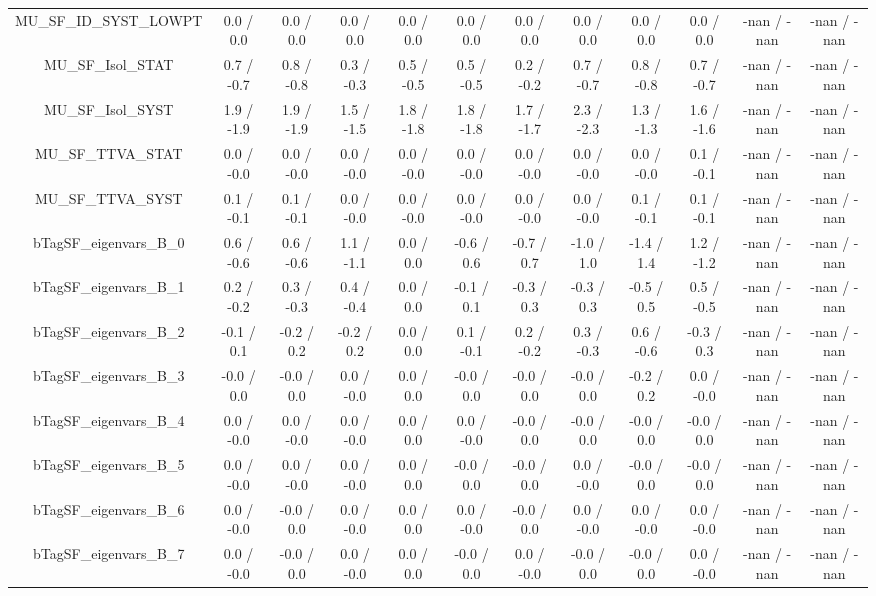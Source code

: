\begin{table}[htbp]
\begin{center}
\begin{tabular}{|c|c|c|c|c|c|c|c|c|c|c|c|}
  MU_SF_ID_SYST_LOWPT & 0.0 / 0.0 & 0.0 / 0.0 & 0.0 / 0.0 & 0.0 / 0.0 & 0.0 / 0.0 & 0.0 / 0.0 & 0.0 / 0.0 & 0.0 / 0.0 & 0.0 / 0.0 & -nan / -nan & -nan / -nan \\ 
  MU_SF_Isol_STAT & 0.7 / -0.7 & 0.8 / -0.8 & 0.3 / -0.3 & 0.5 / -0.5 & 0.5 / -0.5 & 0.2 / -0.2 & 0.7 / -0.7 & 0.8 / -0.8 & 0.7 / -0.7 & -nan / -nan & -nan / -nan \\ 
  MU_SF_Isol_SYST & 1.9 / -1.9 & 1.9 / -1.9 & 1.5 / -1.5 & 1.8 / -1.8 & 1.8 / -1.8 & 1.7 / -1.7 & 2.3 / -2.3 & 1.3 / -1.3 & 1.6 / -1.6 & -nan / -nan & -nan / -nan \\ 
  MU_SF_TTVA_STAT & 0.0 / -0.0 & 0.0 / -0.0 & 0.0 / -0.0 & 0.0 / -0.0 & 0.0 / -0.0 & 0.0 / -0.0 & 0.0 / -0.0 & 0.0 / -0.0 & 0.1 / -0.1 & -nan / -nan & -nan / -nan \\ 
  MU_SF_TTVA_SYST & 0.1 / -0.1 & 0.1 / -0.1 & 0.0 / -0.0 & 0.0 / -0.0 & 0.0 / -0.0 & 0.0 / -0.0 & 0.0 / -0.0 & 0.1 / -0.1 & 0.1 / -0.1 & -nan / -nan & -nan / -nan \\ 
  bTagSF_eigenvars_B_0 & 0.6 / -0.6 & 0.6 / -0.6 & 1.1 / -1.1 & 0.0 / 0.0 & -0.6 / 0.6 & -0.7 / 0.7 & -1.0 / 1.0 & -1.4 / 1.4 & 1.2 / -1.2 & -nan / -nan & -nan / -nan \\ 
  bTagSF_eigenvars_B_1 & 0.2 / -0.2 & 0.3 / -0.3 & 0.4 / -0.4 & 0.0 / 0.0 & -0.1 / 0.1 & -0.3 / 0.3 & -0.3 / 0.3 & -0.5 / 0.5 & 0.5 / -0.5 & -nan / -nan & -nan / -nan \\ 
  bTagSF_eigenvars_B_2 & -0.1 / 0.1 & -0.2 / 0.2 & -0.2 / 0.2 & 0.0 / 0.0 & 0.1 / -0.1 & 0.2 / -0.2 & 0.3 / -0.3 & 0.6 / -0.6 & -0.3 / 0.3 & -nan / -nan & -nan / -nan \\ 
  bTagSF_eigenvars_B_3 & -0.0 / 0.0 & -0.0 / 0.0 & 0.0 / -0.0 & 0.0 / 0.0 & -0.0 / 0.0 & -0.0 / 0.0 & -0.0 / 0.0 & -0.2 / 0.2 & 0.0 / -0.0 & -nan / -nan & -nan / -nan \\ 
  bTagSF_eigenvars_B_4 & 0.0 / -0.0 & 0.0 / -0.0 & 0.0 / -0.0 & 0.0 / 0.0 & 0.0 / -0.0 & -0.0 / 0.0 & -0.0 / 0.0 & -0.0 / 0.0 & -0.0 / 0.0 & -nan / -nan & -nan / -nan \\ 
  bTagSF_eigenvars_B_5 & 0.0 / -0.0 & 0.0 / -0.0 & 0.0 / -0.0 & 0.0 / 0.0 & -0.0 / 0.0 & -0.0 / 0.0 & 0.0 / -0.0 & -0.0 / 0.0 & -0.0 / 0.0 & -nan / -nan & -nan / -nan \\ 
  bTagSF_eigenvars_B_6 & 0.0 / -0.0 & -0.0 / 0.0 & 0.0 / -0.0 & 0.0 / 0.0 & 0.0 / -0.0 & -0.0 / 0.0 & 0.0 / -0.0 & 0.0 / -0.0 & 0.0 / -0.0 & -nan / -nan & -nan / -nan \\ 
  bTagSF_eigenvars_B_7 & 0.0 / -0.0 & -0.0 / 0.0 & 0.0 / -0.0 & 0.0 / 0.0 & -0.0 / 0.0 & 0.0 / -0.0 & -0.0 / 0.0 & -0.0 / 0.0 & 0.0 / -0.0 & -nan / -nan & -nan / -nan \\ 

\end{tabular}
\end{center}
\end{table}
